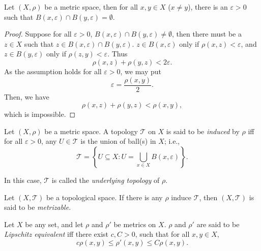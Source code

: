 \begin{theorem}
	\label{prop: metric spaces are Hausdorff}
	Let $(X, \rho)$ be a metric space, then for all $x, y \in X$ ($x \ne y$), there is an $\varepsilon > 0$ such that $B(x, \varepsilon) \cap B (y, \varepsilon) = \emptyset$.
	
	\begin{proof}
		Suppose for all $\varepsilon > 0$, $B(x, \varepsilon) \cap B(y, \varepsilon) \ne \emptyset$, then there must be a $z \in X$ such that $z \in B(x, \varepsilon) \cap B(y, \varepsilon)$. $z \in B(x, \varepsilon)$ only if $\rho(x,z) < \varepsilon$, and $z \in B(y, \varepsilon)$ only if $\rho (z,y) < \varepsilon$. Thus
		$$
		\rho(x, z) + \rho(y,z) < 2\varepsilon.
		$$
		As the assumption holds for all $\varepsilon > 0$, we may put
		$$
		\varepsilon = \frac{\rho(x,y)}{2}.
		$$
		Then, we have
		$$
		\rho(x,z) + \rho(y,z) < \rho(x,y),
		$$
		which is impossible.
	\end{proof}
\end{theorem}


\begin{definition}
	\label{def: induced topologies}
	Let $(X, \rho)$ be a metric space. A topology $\mathcal T$ on $X$ is said to be \textit{induced} by $\rho$ iff for all $\varepsilon > 0$, any $U \in \mathcal T$ is the union of ball(s) in $X$; i.e.,
	$$
	\mathcal T = \left\{ U \subseteq X :  U = \bigcup_{x \in X} B(x, \varepsilon) \right\}.
	$$
	
	In this case, $\mathcal T$ is called the \textit{underlying topology} of $\rho$.
\end{definition}


\begin{definition}
	\label{def: metrizable spaces}
	Let $(X, \mathcal T)$ be a topological space. If there is any $\rho$ induce $\mathcal T$, then $(X, \mathcal T)$ is said to be \textit{metrizable}.
\end{definition}


\begin{definition}
	\label{def: Lipschitz equivalence}
	Let $X$ be any set, and let $\rho$ and $\rho'$ be metrics on $X$. $\rho$ and $\rho'$ are said to be \textit{Lipschitz equivalent} iff there exist $c, C > 0$, such that for all $x,y \in X$,
	$$
	c \rho(x,y) \le \rho'(x,y) \le C \rho(x,y).
	$$
\end{definition}


